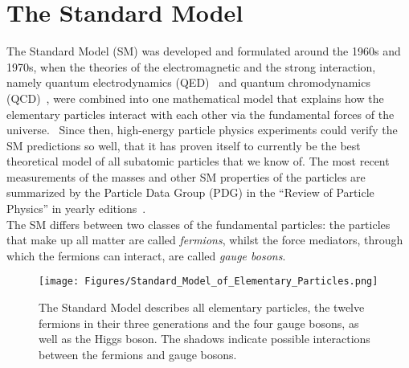 \section{The Standard Model}
\label{StandardModel}
The Standard Model (SM) was developed and formulated around the 1960s and 1970s, when the theories of the electromagnetic and the strong interaction, namely quantum electrodynamics (QED)~\cite{QED,QED2,QED3} and quantum chromodynamics (QCD)~\cite{QCD,QCD2}, were combined into one mathematical model that explains how the elementary particles interact with each other via the fundamental forces of the universe.~\cite[p. 3]{Griffiths}
Since then, high-energy particle physics experiments could verify the SM predictions so well, that it has proven itself to currently be the best theoretical model of all subatomic particles that we know of.
The most recent measurements of the masses and other SM properties of the particles are summarized by the Particle Data Group (PDG) in the ``Review of Particle Physics'' in yearly editions~\cite{PDG}.
\\The SM differs between two classes of the fundamental particles: 
the particles that make up all matter are called \textit{fermions}, whilst the force mediators, through which the fermions can interact, are called \textit{gauge bosons}.
\begin{figure}[htbp]
\centering
\texttt{[image: Figures/Standard\_Model\_of\_Elementary\_Particles.png]}
\caption[Standard Model]{The Standard Model describes all elementary particles, the twelve fermions in their three generations and the four gauge bosons, as well as the Higgs boson.
The shadows indicate possible interactions between the fermions and gauge bosons.~\cite{SM}}
\label{fig:SM}
\end{figure}

